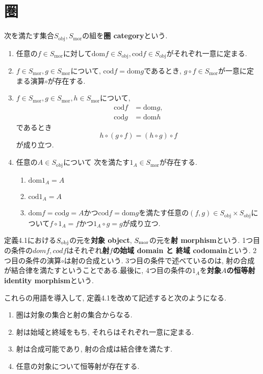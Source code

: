 \section{圏}
\begin{Def}
次を満たす集合$S_{\mathrm{obj}},S_{\mathrm{mor}}$の組を{\bf 圏 category}という.
\begin{enumerate}
\item 任意の$f\in S_\mathrm{mor}$に対して$\mathrm{dom}f\in S_\mathrm{obj},\mathrm{cod}f\in S_\mathrm{obj}$がそれぞれ一意に定まる.
\item $f\in S_{\mathrm{mor}},g\in S_{\mathrm{mor}}$について,
$\mathrm{cod}f=\mathrm{dom}g$であるとき,
$g\circ f\in S_{\mathrm{mor}}$が一意に定まる演算$\circ$が存在する.
\item $f\in S_{\mathrm{mor}},g\in S_{\mathrm{mor}},h\in S_{\mathrm{mor}}$について, \begin{align*}
\mathrm{cod} f&=\mathrm{dom} g,\\ \mathrm{cod} g&=\mathrm{dom} h
\end{align*}であるとき
\[
h\circ(g\circ f)=(h\circ g)\circ f
\]
が成り立つ.
\item 任意の$A\in S_{\mathrm{obj}}$について
次を満たす$1_A\in S_{\mathrm{mor}}$が存在する.
\begin{enumerate}
\item
$\mathrm{dom}1_{A}=A$
\item
$\mathrm{cod}1_A=A$
\item $\mathrm{dom} f=\mathrm{cod} g=A$かつ$\mathrm{cod} f=\mathrm{dom}g$を満たす任意の$(f,g)\in S_{\mathrm{obj}}\times S_{\mathrm{obj}}$について$f\circ 1_A=f$かつ$1_A\circ g=g$が成り立つ.
\end{enumerate}
\end{enumerate}
\end{Def}
定義4.1における$S_{\rm obj}$の元を{\bf 対象 object}, $S_{\rm mor}$の元を{\bf 射 morphism}という.
1つ目の条件の$dom f,cod f$はそれぞれ{\bf 射$f$の始域 domain と 終域 codomain}という. 2つ目の条件の演算$\circ$は射の合成という. 3つ目の条件で述べているのは, 射の合成が結合律を満たすということである.最後に, 4つ目の条件の$1_A$を{\bf 対象$A$の恒等射 identity morphism}という.

これらの用語を導入して, 定義4.1を改めて記述すると次のようになる.
\begin{enumerate}
\item
圏は対象の集合と射の集合からなる.
\item
射は始域と終域をもち, それらはそれぞれ一意に定まる.
\item
射は合成可能であり, 射の合成は結合律を満たす.
\item
任意の対象について恒等射が存在する.
\end{enumerate}

